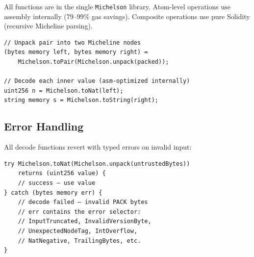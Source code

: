 \documentclass[11pt,a4paper]{article}
\begin{document}
All functions are in the single \texttt{Michelson} library. Atom-level
operations use assembly internally (79--99\% gas savings). Composite operations
use pure Solidity (recursive Micheline parsing).

\begin{codebox}
\begin{lstlisting}[language=Solidity]
// Unpack pair into two Micheline nodes
(bytes memory left, bytes memory right) =
    Michelson.toPair(Michelson.unpack(packed));

// Decode each inner value (asm-optimized internally)
uint256 n = Michelson.toNat(left);
string memory s = Michelson.toString(right);
\end{lstlisting}
\end{codebox}

\subsection{Error Handling}

All decode functions revert with typed errors on invalid input:

\begin{codebox}
\begin{lstlisting}[language=Solidity]
try Michelson.toNat(Michelson.unpack(untrustedBytes))
    returns (uint256 value) {
    // success — use value
} catch (bytes memory err) {
    // decode failed — invalid PACK bytes
    // err contains the error selector:
    // InputTruncated, InvalidVersionByte,
    // UnexpectedNodeTag, IntOverflow,
    // NatNegative, TrailingBytes, etc.
}
\end{lstlisting}
\end{codebox}
\end{document}
